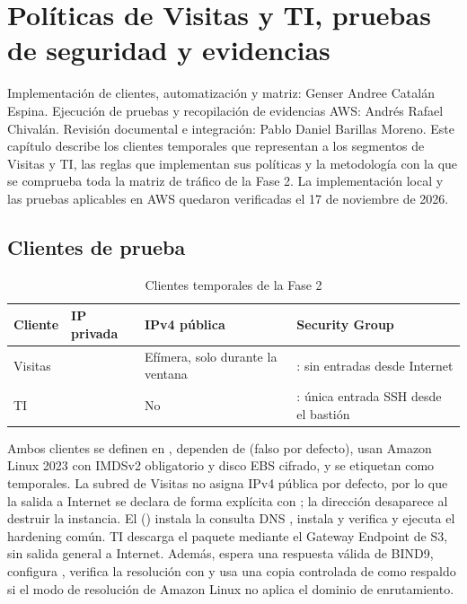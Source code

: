 \chapter[Políticas de Visitas y TI]{Políticas de Visitas y TI, pruebas de seguridad y evidencias}

Implementación de clientes, automatización y matriz: Genser Andree Catalán Espina. Ejecución de
pruebas y recopilación de evidencias AWS: Andrés Rafael Chivalán. Revisión documental e integración:
Pablo Daniel Barillas Moreno. Este
capítulo describe los clientes temporales que representan a los segmentos de Visitas y TI, las
reglas que implementan sus políticas y la metodología con la que se comprueba toda la matriz de
tráfico de la Fase 2. La implementación local y las pruebas aplicables en AWS quedaron verificadas
el 17 de noviembre de 2026.

\section{Clientes de prueba}

\begin{table}[H]
\centering
\caption{Clientes temporales de la Fase 2}
\small
\begin{tabularx}{\textwidth}{>{\raggedright\arraybackslash}p{2.4cm}p{2.3cm}p{3.6cm}Y}
\toprule
\textbf{Cliente} & \textbf{IP privada} & \textbf{IPv4 pública} & \textbf{Security Group} \\
\midrule
Visitas &  & Efímera, solo durante la ventana & : sin entradas desde Internet \\
TI &  & No & : única entrada SSH desde el bastión \\
\bottomrule
\end{tabularx}
\end{table}

Ambos clientes se definen en , dependen de
 (falso por defecto), usan Amazon Linux 2023 con IMDSv2 obligatorio
y disco EBS cifrado, y se etiquetan como temporales. La subred de Visitas no asigna IPv4 pública
por defecto, por lo que la salida a Internet se declara de forma explícita con
; la dirección desaparece al destruir la instancia.
El  () instala la consulta DNS
, instala y verifica  y ejecuta el hardening común. TI
descarga el paquete mediante el Gateway Endpoint de S3, sin salida general a Internet. Además,
espera una respuesta válida de BIND9, configura , verifica la resolución
con  y usa una copia controlada de  como respaldo si el modo
de resolución de Amazon Linux no aplica el dominio de enrutamiento.


